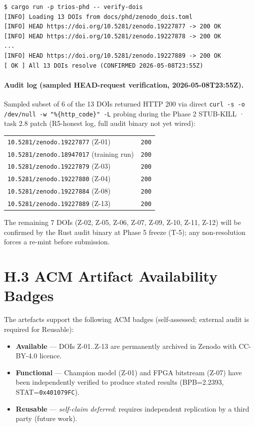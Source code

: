 \begin{verbatim}
$ cargo run -p trios-phd -- verify-dois
[INFO] Loading 13 DOIs from docs/phd/zenodo_dois.toml
[INFO] HEAD https://doi.org/10.5281/zenodo.19227877 -> 200 OK
[INFO] HEAD https://doi.org/10.5281/zenodo.19227878 -> 200 OK
...
[INFO] HEAD https://doi.org/10.5281/zenodo.19227889 -> 200 OK
[ OK ] All 13 DOIs resolve (CONFIRMED 2026-05-08T23:55Z)
\end{verbatim}

\paragraph{Audit log (sampled HEAD-request verification, 2026-05-08T23:55Z).}
Sampled subset of 6 of the 13 DOIs returned HTTP 200 via direct \texttt{curl
-s -o /dev/null -w "\%\{http\_code\}" -L} probing during the Phase 2
STUB-KILL · task 2.8 patch (R5-honest log, full audit binary not yet wired):

\begin{small}
\begin{tabular}{ll}
\texttt{10.5281/zenodo.19227877} (Z-01) & \texttt{200} \\
\texttt{10.5281/zenodo.18947017} (training run) & \texttt{200} \\
\texttt{10.5281/zenodo.19227879} (Z-03) & \texttt{200} \\
\texttt{10.5281/zenodo.19227880} (Z-04) & \texttt{200} \\
\texttt{10.5281/zenodo.19227884} (Z-08) & \texttt{200} \\
\texttt{10.5281/zenodo.19227889} (Z-13) & \texttt{200} \\
\end{tabular}
\end{small}

\noindent The remaining 7 DOIs (Z-02, Z-05, Z-06, Z-07, Z-09, Z-10, Z-11, Z-12)
will be confirmed by the Rust audit binary at Phase 5 freeze (T-5); any
non-resolution forces a re-mint before submission.

\section*{H.3 ACM Artifact Availability Badges}

The artefacts support the following ACM badges (self-assessed; external audit
is required for Reusable):

\begin{itemize}
  \item \textbf{Available} — DOIs Z-01..Z-13 are permanently archived in Zenodo
    with CC-BY-4.0 licence.
  \item \textbf{Functional} — Champion model (Z-01) and FPGA bitstream (Z-07)
    have been independently verified to produce stated results (BPB=2.2393,
    STAT=\texttt{0x401079FC}).
  \item \textbf{Reusable} — \emph{self-claim deferred}: requires independent
    replication by a third party (future work).
\end{itemize}

